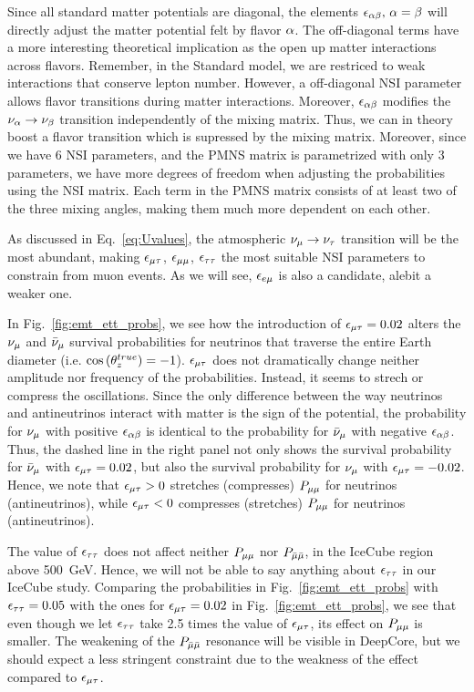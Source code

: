 Since all standard matter potentials are diagonal, 
the elements $\epsilon_{\alpha\beta},\, \alpha = \beta$ will directly adjust the matter potential felt 
by flavor $\alpha$. The off-diagonal terms have a more interesting theoretical implication as the open up matter interactions across flavors. Remember, in the Standard model,
we are restriced to weak interactions that conserve lepton number. However, a off-diagonal NSI parameter allows flavor transitions during matter interactions.
Moreover, $\epsilon_{\alpha\beta}$ modifies the $\nu_\alpha \to \nu_\beta$ transition independently
of the mixing matrix. Thus, we can in theory boost a flavor transition which is supressed by the mixing matrix. Moreover, since we have 6 NSI parameters, and the PMNS
matrix is parametrized with only 3 parameters, we have more degrees of freedom when adjusting the probabilities using the NSI matrix. Each term in the PMNS matrix consists of at least
two of the three mixing angles, making them much more dependent on each other.

As discussed in Eq.~\ref{eq:Uvalues}, the atmospheric $\nu_\mu \to \nu_\tau$ transition will be the most abundant, making $\epsilon_{\mu\tau}$, $\epsilon_{\mu\mu}$, $\epsilon_{\tau\tau}$ the most suitable
NSI parameters to constrain from muon events. As we will see, $\epsilon_{e\mu}$ is also a candidate, alebit a weaker one. 

In Fig.~\ref{fig:emt_ett_probs}, we see how the introduction of $\epsilon_{\mu\tau} = 0.02$ alters the $\nu_\mu$ and $\bar{\nu}_\mu$ survival probabilities
for neutrinos that traverse the entire Earth diameter (i.e. $\cos{(\theta_z^{true})} = -1$). $\epsilon_{\mu\tau}$ does not dramatically change neither
amplitude nor frequency of the probabilities. Instead, it seems to strech or compress the oscillations. Since the 
only difference between the way neutrinos and antineutrinos interact with matter is the sign of the potential, the probability for
$\nu_\mu$ with positive $\epsilon_{\alpha\beta}$ is identical to the probability for $\bar{\nu}_\mu$ with negative $\epsilon_{\alpha\beta}$. Thus, the dashed line 
in the right panel not only shows the survival probability for $\bar{\nu}_\mu$ with $\epsilon_{\mu\tau}=0.02$, but also the survival probability for $\nu_\mu$ with $\epsilon_{\mu\tau}=-0.02$.
Hence, we note that $\epsilon_{\mu\tau} > 0$ stretches (compresses) $P_{\mu\mu}$ for neutrinos (antineutrinos), while $\epsilon_{\mu\tau} < 0$ compresses (stretches) $P_{\mu\mu}$ for neutrinos (antineutrinos).

The value of $\epsilon_{\tau\tau}$ does not affect neither $P_{\mu\mu}$ nor $P_{\bar{\mu} \bar{\mu}}$, in the IceCube region above \SI{500}{\GeV}. Hence, we will not be able
to say anything about $\epsilon_{\tau\tau}$ in our IceCube study.  Comparing the probabilities in Fig.~\ref{fig:emt_ett_probs} with $\epsilon_{\tau\tau} = 0.05$ with the ones for $\epsilon_{\mu\tau} = 0.02$ in Fig.~\ref{fig:emt_ett_probs},
we see that even though we let $\epsilon_{\tau\tau}$ take 2.5 times the value of $\epsilon_{\mu\tau}$, its effect on $P_{\mu\mu}$ is smaller. The weakening of the $P_{\bar{\mu} \bar{\mu}}$ resonance will be visible in DeepCore, but we should expect a less stringent 
constraint due to the weakness of the effect compared to $\epsilon_{\mu\tau}$. 

